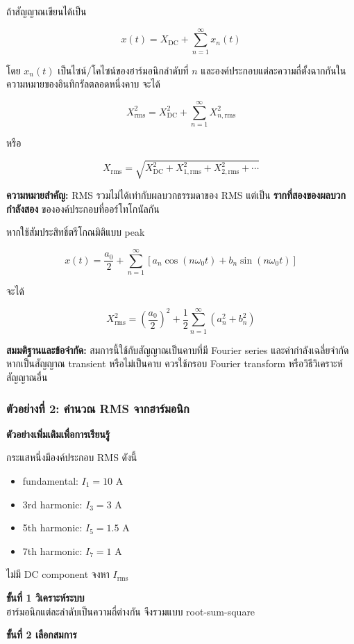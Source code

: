 ถ้าสัญญาณเขียนได้เป็น

\[
x(t)=X_{\mathrm{DC}}+\sum_{n=1}^{\infty}x_n(t)
\]

โดย $x_n(t)$ เป็นไซน์/โคไซน์ของฮาร์มอนิกลำดับที่ $n$ และองค์ประกอบแต่ละความถี่ตั้งฉากกันในความหมายของอินทิกรัลตลอดหนึ่งคาบ จะได้

\[
X_{\mathrm{rms}}^2=X_{\mathrm{DC}}^2+\sum_{n=1}^{\infty}X_{n,\mathrm{rms}}^2
\]

หรือ

\[
X_{\mathrm{rms}}=\sqrt{X_{\mathrm{DC}}^2+X_{1,\mathrm{rms}}^2+X_{2,\mathrm{rms}}^2+\cdots}
\]

\textbf{ความหมายสำคัญ:} RMS รวมไม่ได้เท่ากับผลบวกธรรมดาของ RMS แต่เป็น \textbf{รากที่สองของผลบวกกำลังสอง} ขององค์ประกอบที่ออร์โทโกนัลกัน

หากใช้สัมประสิทธิ์ตรีโกณมิติแบบ peak

\[
x(t)=\frac{a_0}{2}+\sum_{n=1}^{\infty}[a_n\cos(n\omega_0t)+b_n\sin(n\omega_0t)]
\]

จะได้

\[
X_{\mathrm{rms}}^2=\left(\frac{a_0}{2}\right)^2+\frac{1}{2}\sum_{n=1}^{\infty}(a_n^2+b_n^2)
\]

\textbf{สมมติฐานและข้อจำกัด:} สมการนี้ใช้กับสัญญาณเป็นคาบที่มี Fourier series และค่ากำลังเฉลี่ยจำกัด หากเป็นสัญญาณ transient หรือไม่เป็นคาบ ควรใช้กรอบ Fourier transform หรือวิธีวิเคราะห์สัญญาณอื่น

\subsubsection{ตัวอย่างที่ 2: คำนวณ RMS จากฮาร์มอนิก}

\textbf{ตัวอย่างเพิ่มเติมเพื่อการเรียนรู้}

กระแสหนึ่งมีองค์ประกอบ RMS ดังนี้

\begin{itemize}
    \item fundamental: $I_1=10$ A
    \item 3rd harmonic: $I_3=3$ A
    \item 5th harmonic: $I_5=1.5$ A
    \item 7th harmonic: $I_7=1$ A
\end{itemize}

ไม่มี DC component จงหา $I_{\mathrm{rms}}$

\textbf{ขั้นที่ 1 วิเคราะห์ระบบ} \\
ฮาร์มอนิกแต่ละลำดับเป็นความถี่ต่างกัน จึงรวมแบบ root-sum-square

\textbf{ขั้นที่ 2 เลือกสมการ}

